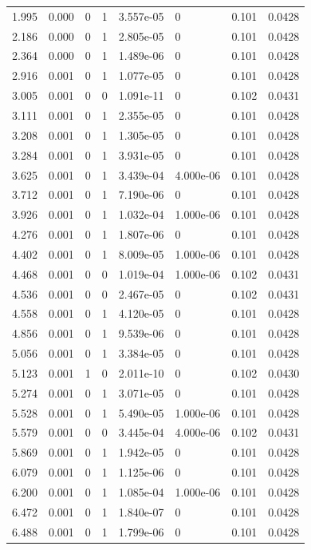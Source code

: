 \documentclass[preview]{standalone}
\begin{document}
{{\begin{tabular}{L{1.2cm}C{1.2cm} C{0.3cm}C{0.5cm} C{1.4cm}C{1.4cm} C{1.4cm}C{1.4cm}}
  1.995  &  0.000  & 0     &  1 &  3.557e-05  & 0  & 0.101 &  0.0428   \\ 
  2.186  &  0.000  & 0     &  1 &  2.805e-05  & 0  & 0.101 &  0.0428   \\ 
  2.364  &  0.000  & 0     &  1 &  1.489e-06  & 0  & 0.101 &  0.0428   \\ 
  2.916  &  0.001  & 0     &  1 &  1.077e-05  & 0  & 0.101 &  0.0428   \\ 
  3.005  &  0.001  & 0     &  0 &  1.091e-11  & 0  & 0.102 &  0.0431   \\ 
  3.111  &  0.001  & 0     &  1 &  2.355e-05  & 0  & 0.101 &  0.0428   \\ 
  3.208  &  0.001  & 0     &  1 &  1.305e-05  & 0  & 0.101 &  0.0428   \\ 
  3.284  &  0.001  & 0     &  1 &  3.931e-05  & 0  & 0.101 &  0.0428   \\ 
  3.625  &  0.001  & 0     &  1 &  3.439e-04  & 4.000e-06  & 0.101 &  0.0428   \\ 
  3.712  &  0.001  & 0     &  1 &  7.190e-06  & 0  & 0.101 &  0.0428   \\ 
  3.926  &  0.001  & 0     &  1 &  1.032e-04  & 1.000e-06  & 0.101 &  0.0428   \\ 
  4.276  &  0.001  & 0     &  1 &  1.807e-06  & 0  & 0.101 &  0.0428   \\ 
  4.402  &  0.001  & 0     &  1 &  8.009e-05  & 1.000e-06  & 0.101 &  0.0428   \\ 
  4.468  &  0.001  & 0     &  0 &  1.019e-04  & 1.000e-06  & 0.102 &  0.0431   \\ 
  4.536  &  0.001  & 0     &  0 &  2.467e-05  & 0  & 0.102 &  0.0431   \\ 
  4.558  &  0.001  & 0     &  1 &  4.120e-05  & 0  & 0.101 &  0.0428   \\ 
  4.856  &  0.001  & 0     &  1 &  9.539e-06  & 0  & 0.101 &  0.0428   \\ 
  5.056  &  0.001  & 0     &  1 &  3.384e-05  & 0  & 0.101 &  0.0428   \\ 
  5.123  &  0.001  & 1     &  0 &  2.011e-10  & 0  & 0.102 &  0.0430   \\ 
  5.274  &  0.001  & 0     &  1 &  3.071e-05  & 0  & 0.101 &  0.0428   \\ 
  5.528  &  0.001  & 0     &  1 &  5.490e-05  & 1.000e-06  & 0.101 &  0.0428   \\ 
  5.579  &  0.001  & 0     &  0 &  3.445e-04  & 4.000e-06  & 0.102 &  0.0431   \\ 
  5.869  &  0.001  & 0     &  1 &  1.942e-05  & 0  & 0.101 &  0.0428   \\ 
  6.079  &  0.001  & 0     &  1 &  1.125e-06  & 0  & 0.101 &  0.0428   \\ 
  6.200  &  0.001  & 0     &  1 &  1.085e-04  & 1.000e-06  & 0.101 &  0.0428   \\ 
  6.472  &  0.001  & 0     &  1 &  1.840e-07  & 0  & 0.101 &  0.0428   \\ 
  6.488  &  0.001  & 0     &  1 &  1.799e-06  & 0  & 0.101 &  0.0428   \\ 
\hline 
\end{tabular} 

}}
\end{document}
